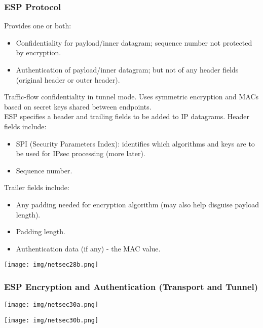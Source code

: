 \documentclass[a4paper, 10pt, titlepage]{article}
\begin{document}
\subsubsection{ESP Protocol}
Provides one or both:
\begin{itemize}
	\item Confidentiality for payload/inner datagram; sequence
	number not protected by encryption.
	\item Authentication of payload/inner datagram; but not of
	any header fields (original header or outer header).
\end{itemize}
Traffic-flow confidentiality in tunnel mode. Uses symmetric encryption and MACs based on secret keys shared between endpoints. \medskip\\
ESP specifies a header and trailing fields to be added to IP datagrams. Header fields include:
\begin{itemize}
	\item SPI (Security Parameters Index): identifies which 	algorithms and keys are to be used for IPsec processing 	(more later).
	\item Sequence number.
\end{itemize}
Trailer fields include:
\begin{itemize}
	\item Any padding needed for encryption algorithm (may also
	help disguise payload length).
	\item Padding length.
	\item Authentication data (if any) - the MAC value.
\end{itemize}
\begin{center}
	\texttt{[image: img/netsec28b.png]}
\end{center}

\subsubsection*{ESP Encryption and Authentication (Transport and Tunnel)}
\begin{minipage}{0.45\textwidth}
	\begin{center}
		\texttt{[image: img/netsec30a.png]}
	\end{center}
\end{minipage}
\hfill
\begin{minipage}{0.45\textwidth}
	\begin{center}
		\texttt{[image: img/netsec30b.png]}
	\end{center}
\end{minipage}
\end{document}
